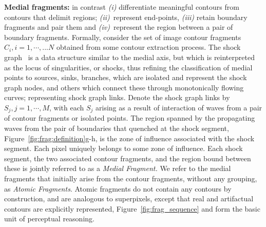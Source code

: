 \textbf{Medial fragments: }\cite{Tamrakar:Kimia:POCV04} in contrast \textit{(i)} differentiate meaningful contours from
contours that delimit regions; \textit{(ii)}\ represent end-points, \textit{(iii)} retain  boundary
fragments and pair them and \textit{(iv)}\ represent the region between a pair of boundary
fragments.  Formally, consider the set of image contour fragments $C_i, i=1,\cdots,...N$
obtained from some contour extraction process. The shock graph~\cite{Kimia:etal:ECCV:Book,Kimia:etal:Shape:Series:I,Giblin:Kimia:Reconstruction:PAMI03} is a data structure similar to the medial axis, but which is reinterpreted as the locus of singularities, or shocks, thus refining the classification of medial points to sources, sinks, branches, which are isolated and represent the shock graph nodes, and others which connect these through monotonically flowing curves; representing shock graph links. Denote the shock graph links by $S_j, j=1,\cdots,M$, with each $S_j$ arising as a result of interaction of waves from a pair of  contour fragments or
isolated points. The region spanned by the propagating
waves from the pair of boundaries that quenched at the shock segment, Figure~\ref{fig:frag:definition}g-h, is the zone of influence associated with the shock segment. Each pixel uniquely belongs to some zone of influence. Each shock segment, the two associated contour fragments, and the region bound between these is jointly referred to as a {\em Medial Fragment.} We refer to the medial fragments that
initially arise from the contour fragments, without any grouping, as {\em Atomic Fragments}. Atomic fragments do not contain any contours by construction, and
are analogous to superpixels, except that real and artifactual contours
are explicitly represented, Figure~\ref{fig:frag_sequence} and form the basic unit of perceptual reasoning.


